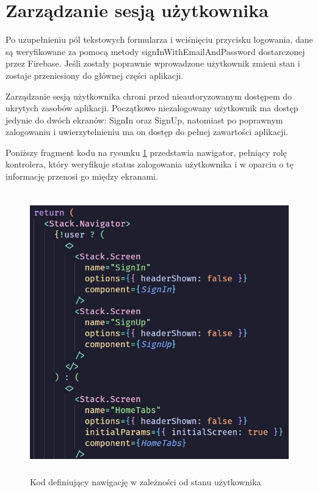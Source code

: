 \section*{Zarządzanie sesją użytkownika}
Po uzupełnieniu pól tekstowych formularza i wciśnięciu przycisku logowania, dane są weryfikowane za pomocą metody signInWithEmailAndPassword dostarczonej przez Firebase. Jeśli zostały poprawnie wprowadzone użytkownik zmieni stan i zostaje przeniesiony do głównej części aplikacji.

Zarządzanie sesją użytkownika chroni przed nieautoryzowanym dostępem do ukrytych zasobów aplikacji. Początkowo niezalogowany użytkownik ma dostęp jedynie do dwóch ekranów: SignIn oraz SignUp, natomiast po poprawnym zalogowaniu
i uwierzytelnieniu ma on dostęp do pełnej zawartości aplikacji.

Poniższy fragment kodu na rysunku \ref{fig:Nawigator} przedstawia nawigator, pełniący rolę kontrolera, który weryfikuje status zalogowania użytkownika i w oparciu o tę informację przenosi go między ekranami.
\\
\begin{figure}[ht]
	\centering
	\vspace{0.25cm}
	\includegraphics[height=12.22cm]{images/bezpieczenstwo/nawigator}
	\caption{Kod definiujący nawigację w zależności od stanu użytkownika}
	\label{fig:Nawigator}
\end{figure}


